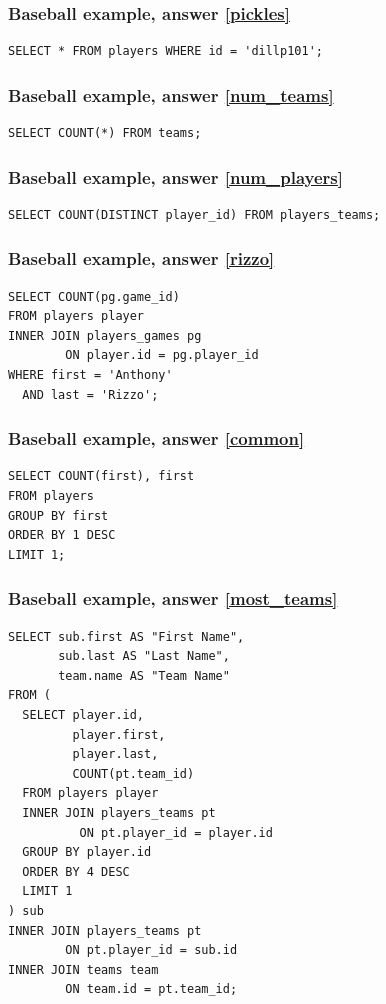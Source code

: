 \documentclass[aspectratio=169]{beamer}
\begin{document}
\begin{frame}[fragile]
  \frametitle{Baseball example, answer \ref{pickles}}
  \begin{lstlisting}
SELECT * FROM players WHERE id = 'dillp101';
  \end{lstlisting}
\end{frame}

\begin{frame}[fragile]
  \frametitle{Baseball example, answer \ref{num_teams}}
  \begin{lstlisting}
SELECT COUNT(*) FROM teams;
  \end{lstlisting}
\end{frame}

\begin{frame}[fragile]
  \frametitle{Baseball example, answer \ref{num_players}}
  \begin{lstlisting}
SELECT COUNT(DISTINCT player_id) FROM players_teams;
  \end{lstlisting}
\end{frame}

\begin{frame}[fragile]
  \frametitle{Baseball example, answer \ref{rizzo}}
  \begin{lstlisting}
SELECT COUNT(pg.game_id)
FROM players player
INNER JOIN players_games pg
        ON player.id = pg.player_id
WHERE first = 'Anthony'
  AND last = 'Rizzo';
  \end{lstlisting}
\end{frame}

\begin{frame}[fragile]
  \frametitle{Baseball example, answer \ref{common}}
  \begin{lstlisting}
SELECT COUNT(first), first
FROM players
GROUP BY first
ORDER BY 1 DESC
LIMIT 1;
  \end{lstlisting}
\end{frame}

\begin{frame}[fragile]
  \frametitle{Baseball example, answer \ref{most_teams}}
  \begin{lstlisting}
SELECT sub.first AS "First Name",
       sub.last AS "Last Name",
       team.name AS "Team Name"
FROM (
  SELECT player.id,
         player.first,
         player.last,
         COUNT(pt.team_id)
  FROM players player
  INNER JOIN players_teams pt
          ON pt.player_id = player.id
  GROUP BY player.id
  ORDER BY 4 DESC
  LIMIT 1
) sub
INNER JOIN players_teams pt
        ON pt.player_id = sub.id
INNER JOIN teams team
        ON team.id = pt.team_id;
  \end{lstlisting}
\end{frame}
\end{document}
